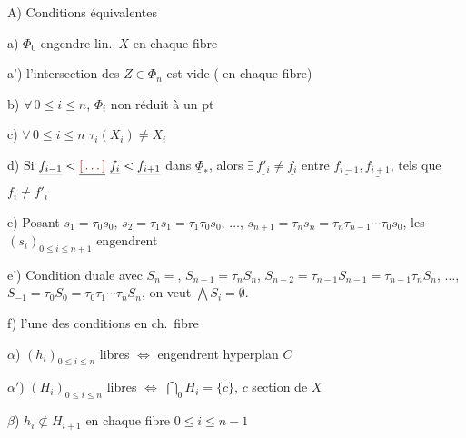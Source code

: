 \documentclass[11pt,a4paper]{article}
\begin{document}
A) Conditions équivalentes


a) $\Phi_0$ engendre lin.\ $X$ en chaque fibre

a') l'intersection des $Z \in \Phi_n$ est vide (\struck{\ill{}} en chaque fibre)

b) $\forall\, 0 \leq i \leq n$, $\Phi_i$ non réduit à un pt

c) $\forall\, 0 \leq i \leq n$ $\tau_i(X_i) \neq X_i$

d) Si $\underline{f_{i-1}} < \struck{\ill{}}\ \underline{f_i} < \underline{f_{i+1}}$ dans $\underline{\Phi}_*$, alors $\exists\, \underline{f'_i} \neq \underline{f_i}$ entre $\underline{f_{i-1}}, \underline{f_{i+1}}$, tels que $f_i \neq f'_i$

e) Posant $s_1 = \tau_0 s_0$, $s_2 = \tau_1 s_1 = \tau_1 \tau_0 s_0$, $\dots$, $s_{n+1} = \tau_n s_n = \tau_n \tau_{n-1} \cdots \tau_0 s_0$, les $(s_i)_{0 \leq i \leq n+1}$ engendrent   

e') Condition duale avec $S_n =$\ill{}, \struck{\ill{}} $S_{n-1} = \tau_n S_n$, $S_{n-2} = \tau_{n-1} S_{n-1} = \tau_{n-1} \tau_n S_n$, $\dots$, $S_{-1} = \tau_0 S_0 = \tau_0 \tau_1 \cdots \tau_n S_n$, on veut $\bigwedge S_i = \emptyset$.


f) \ill{} l'une des \struck{\ill{}} conditions en ch.\ fibre

$\alpha$) \struck{\ill{}} $(h_i)_{0 \leq i \leq n}$ libres $\Longleftrightarrow$ engendrent hyperplan $C$

$\alpha'$) $(H_i)_{0 \leq i \leq n}$ libres $\Longleftrightarrow$ $\bigcap_0 H_i = \{c\}$, $c$ section de $X$

$\beta$) $h_i \not\subset H_{i+1}$ en chaque fibre $0 \leq i \leq n-1$


\end{document}
